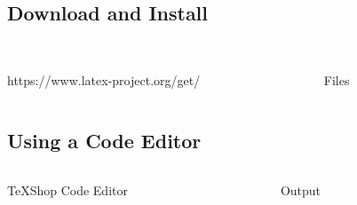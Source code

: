 \documentclass[aspectratio=169,mathserif,8pt,xcolor=table,notes=show]{beamer}
\begin{document}
	\subsection{Download and Install} %
		\label{sub:download_and_install}
		\begin{frame}[t]{}
			\begin{columns}[T]
				\begin{column}{.5\textwidth}
					\centering
					\quad\\[.2in]https://www.latex-project.org/get/\\[.2in]
				\end{column}
				\begin{column}{.5\textwidth}
					\centering
					\quad\\[.2in]
					Files\\[.2in]
				\end{column}
			\end{columns}
		\end{frame}
	\subsection{Using a Code Editor} %
		\label{sub:using_a_code_editor}
		\begin{frame}[t]{}
			\begin{columns}[T]
				\begin{column}{.433\textwidth}
					\centering
					TeXShop Code Editor\\[.1in]
				\end{column}
				\begin{column}{.433\textwidth}
					\centering
					Output\\[.1in]
				\end{column}
			\end{columns}
		\end{frame}
\end{document}
